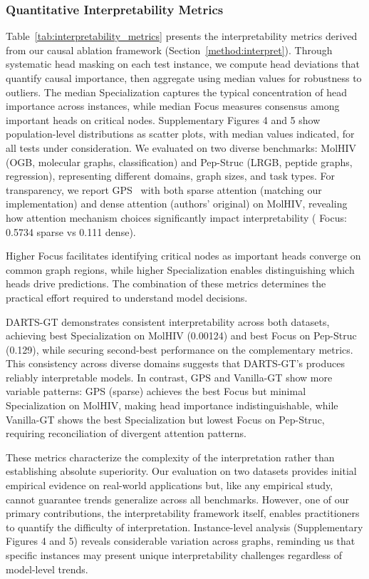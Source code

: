 \documentclass[lettersize,journal]{IEEEtran}
\begin{document}
\subsubsection{Quantitative Interpretability Metrics}

Table~\ref{tab:interpretability_metrics} presents the interpretability metrics derived from our causal ablation framework (Section~\ref{method:interpret}). Through systematic head masking on each test instance, we compute head deviations that quantify causal importance, then aggregate using median values for robustness to outliers. The median Specialization captures the typical concentration of head importance across instances, while median Focus measures consensus among important heads on critical nodes. Supplementary Figures 4 and 5 show population-level distributions as scatter plots, with median values indicated, for all tests under consideration.
 We evaluated on two diverse benchmarks: MolHIV (OGB, molecular graphs, classification) and Pep-Struc (LRGB, peptide graphs, regression), representing different domains, graph sizes, and task types. For transparency, we report GPS~\cite{rampa_recipe_nodate} with both sparse attention (matching our implementation) and dense attention (authors' original) on MolHIV, revealing how attention mechanism choices significantly impact interpretability ( Focus: 0.5734 sparse vs 0.111 dense).

    Higher Focus facilitates identifying critical nodes as important heads converge on common graph regions, while higher Specialization enables distinguishing which heads drive predictions. The combination of these metrics determines the practical effort required to understand model decisions.

DARTS-GT demonstrates consistent interpretability across both datasets, achieving best Specialization on MolHIV (0.00124) and best Focus on Pep-Struc (0.129), while securing second-best performance on the complementary metrics. This consistency across diverse domains suggests that DARTS-GT's produces reliably interpretable models. In contrast, GPS and Vanilla-GT show more variable patterns: GPS (sparse) achieves the best Focus but minimal Specialization on MolHIV, making head importance indistinguishable, while Vanilla-GT shows the best Specialization but lowest Focus on Pep-Struc, requiring reconciliation of divergent attention patterns.

These metrics characterize the complexity of the interpretation rather than establishing absolute superiority. Our evaluation on two datasets provides initial empirical evidence on real-world applications but, like any empirical study, cannot guarantee trends generalize across all benchmarks.  However, one of our primary contributions, the interpretability framework itself, enables practitioners to quantify the difficulty of interpretation. Instance-level analysis (Supplementary Figures 4 and 5) reveals considerable variation across graphs, reminding us that specific instances may present unique interpretability challenges regardless of model-level trends.
\end{document}
